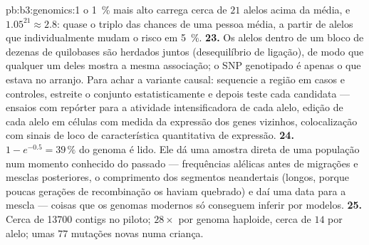 \begin{solution}{pb:b3:genomics:1}
o \qty{1}{\%} mais alto carrega cerca de $21$ alelos acima da média, e
$1.05^{21} \approx
2.8$: quase o triplo das chances de uma pessoa
média, a partir de alelos que individualmente mudam o risco em
\qty{5}{\%}.
\textbf{23.} Os alelos dentro de um bloco de dezenas de quilobases são
herdados juntos (desequilíbrio de ligação), de modo que qualquer um
deles mostra a mesma associação; o SNP genotipado é apenas o que estava
no arranjo. Para achar a variante causal: sequencie a região em casos e
controles, estreite o conjunto estatisticamente e depois teste cada
candidata --- ensaios com repórter para a atividade intensificadora de
cada alelo, edição de cada alelo em células com medida da expressão dos
genes vizinhos, colocalização com sinais de loco de característica
quantitativa de expressão.
\textbf{24.} $1 - e^{-0.5} = 39\,\%$ do genoma é lido. Ele dá uma
amostra direta de uma população num momento conhecido do passado ---
frequências alélicas antes de migrações e mesclas posteriores, o
comprimento dos segmentos neandertais (longos, porque poucas gerações
de recombinação os haviam quebrado) e daí uma data para a mescla ---
coisas que os genomas modernos só conseguem inferir por modelos.
\textbf{25.} Cerca de \num{13700} contigs no piloto; $28\times$ por
genoma haploide, cerca de $14$  por alelo; umas $77$ mutações
novas numa criança.
\end{solution}
